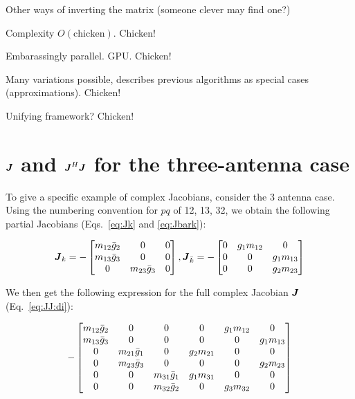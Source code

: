 \documentclass[useAMS,usenatbib]{mn2e}
\newcommand{\mat}[1]{{\bmath{#1}}}
\newcommand{\JJ}{\mat{J}} %
\begin{document}
Other ways of inverting the matrix (someone clever may find one?)

Complexity $O(\mathrm{chicken}).$ Chicken!

Embarassingly parallel. GPU. Chicken!

Many variations possible, describes previous algorithms as special cases (approximations). Chicken!

Unifying framework? Chicken!




\appendix

\section{$\JJ$ and $\JJ^H\JJ$ for the three-antenna case}
\label{sec:3ant}

To give a specific example of complex Jacobians, consider the 3 antenna case.
Using the numbering convention for $pq$ of 12, 13, 32, we obtain the following partial Jacobians
(Eqs.~\ref{eq:Jk} and \ref{eq:Jbark}):

\[
\JJ_k = - \Matrix{ccc}{m_{12}\bar{g}_2 & 0 & 0 \\ m_{13}\bar{g}_3 & 0 & 0 \\ 0 & m_{23}\bar{g}_3 & 0 },
\JJ_{\bar{k}} = - \Matrix{ccc}{0 & g_1 m_{12} & 0 \\ 0 & 0 & g_1 m_{13} \\ 0 & 0 & g_2 m_{23} }
\]

We then get the following expression
for the full complex Jacobian $\JJ$ (Eq.~\ref{eq:JJ:di}):

\begin{equation}
\label{eq:JJ:3ant}
-\Matrix{cccccc}{
  m_{12}\bar{g}_2 & 0               & 0 &  0          & g_1 m_{12} & 0           \\
  m_{13}\bar{g}_3 & 0               & 0 &  0          & 0          & g_1 m_{13}  \\
  0               & m_{21}\bar{g}_1 & 0 &  g_2 m_{21} & 0          & 0  \\
  0               & m_{23}\bar{g}_3 & 0 &  0          & 0          & g_2 m_{23} \\
  0               & 0               & m_{31}\bar{g}_1 & g_1 m_{31} & 0          & 0  \\
  0               & 0               & m_{32}\bar{g}_2 & 0 & g_3 m_{32} & 0 \\
}
\end{equation}
\end{document}
